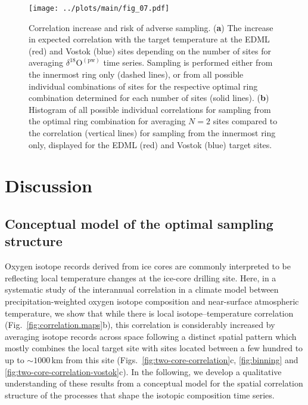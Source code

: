 \documentclass[cp, manuscript]{copernicus}
\begin{document}
\begin{figure*}[t]%
\centering
\texttt{[image: ../plots/main/fig\_07.pdf]}
\caption{%
  Correlation increase and risk of adverse sampling. (\textbf{a}) The increase
  in expected correlation with the target temperature at the EDML (red) and
  Vostok (blue) sites depending on the number of sites for averaging
  $\delta^{18}\mathrm{O}^{\mathrm{(pw)}}$ time series. Sampling is performed
  either from the innermost ring only (dashed lines), or from all possible
  individual combinations of sites for the respective optimal ring combination
  determined for each number of sites (solid lines). (\textbf{b}) Histogram of
  all possible individual correlations for sampling from the optimal ring
  combination for averaging $N=2$ sites compared to the correlation (vertical
  lines) for sampling from the innermost ring only, displayed for the EDML (red)
  and Vostok (blue) target sites.}
\label{fig:cor.increase.risk}%
\end{figure*}%

\section{Discussion}\label{discussion}

\subsection{Conceptual model of the optimal sampling structure}
\label{discussion:concept.model}

Oxygen isotope records derived from ice cores are commonly interpreted to be
reflecting local temperature changes at the ice-core drilling site. Here, in a
systematic study of the interannual correlation in a climate model between
precipitation-weighted oxygen isotope composition and near-surface atmospheric
temperature, we show that while there is local isotope--temperature correlation
(Fig.~\ref{fig:correlation.maps}b), this correlation is considerably increased
by averaging isotope records across space following a distinct spatial pattern
which mostly combines the local target site with sites located between a few
hundred to up to $\sim1000$\,km from this site
(Figs.~\ref{fig:two-core-correlation}c, \ref{fig:binning} and
\ref{fig:two-core-correlation-vostok}c). In the following, we develop a
qualitative understanding of these results from a conceptual model for the
spatial correlation structure of the processes that shape the isotopic
composition time series.
\end{document}
